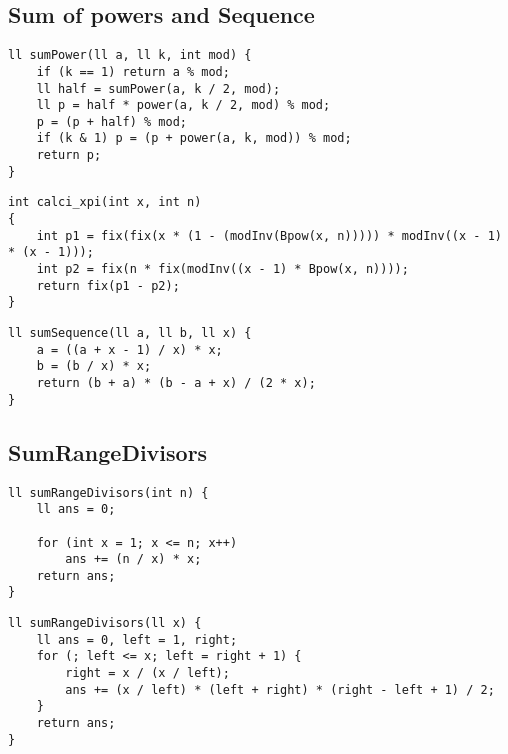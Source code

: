 \subsection{Sum of powers and Sequence}

\begin{lstlisting}[style=cpp]
ll sumPower(ll a, ll k, int mod) {  
    if (k == 1) return a % mod;  
    ll half = sumPower(a, k / 2, mod);  
    ll p = half * power(a, k / 2, mod) % mod;  
    p = (p + half) % mod;  
    if (k & 1) p = (p + power(a, k, mod)) % mod;  
    return p;  
}
\end{lstlisting}

\begin{lstlisting}[style=cpp]
int calci_xpi(int x, int n)  
{  
    int p1 = fix(fix(x * (1 - (modInv(Bpow(x, n))))) * modInv((x - 1) * (x - 1)));  
    int p2 = fix(n * fix(modInv((x - 1) * Bpow(x, n))));  
    return fix(p1 - p2);  
}
\end{lstlisting}

\begin{lstlisting}[style=cpp]
ll sumSequence(ll a, ll b, ll x) {  
    a = ((a + x - 1) / x) * x;  
    b = (b / x) * x;  
    return (b + a) * (b - a + x) / (2 * x);  
}
\end{lstlisting}

\subsection{SumRangeDivisors}

\begin{lstlisting}[style=cpp]
ll sumRangeDivisors(int n) {  
    ll ans = 0;  
      
    for (int x = 1; x <= n; x++)  
        ans += (n / x) * x;  
    return ans;  
}
\end{lstlisting}

\begin{lstlisting}[style=cpp]
ll sumRangeDivisors(ll x) {  
    ll ans = 0, left = 1, right;  
    for (; left <= x; left = right + 1) {  
        right = x / (x / left);  
        ans += (x / left) * (left + right) * (right - left + 1) / 2;  
    }  
    return ans;  
}
\end{lstlisting}

